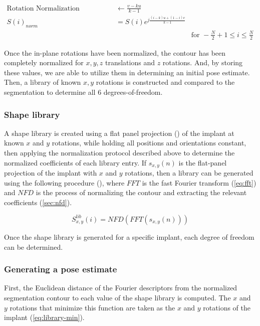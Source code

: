 \begin{equation}
    \begin{aligned}
    \text{Rotation Normalization Coefficient} &\leftarrow \frac{v - ku}{k-1}\\
    S(i)_{norm} &= S(i)e^{j\frac{(i-k)u + (1-i)v}{k-1}} & \\
    & & \text{for } - \frac{N}{2}+1 \le i \le \frac{N}{2}
    \end{aligned}
    \label{eq:fft-rot-norm}
\end{equation}

Once the in-plane rotations have been normalized, the contour has been completely normalized for $x, y,z$ translations and $z$ rotations.
And, by storing these values, we are able to utilize them in determining an initial pose estimate.
Then, a library of known $x,y$ rotations is constructed and compared to the segmentation to determine all 6 degrees-of-freedom.

\subsubsection{Shape library}
A shape library is created using a flat panel projection () of the implant at known $x$ and $y$ rotations, while holding all positions and orientations constant, then applying the normalization protocol described above to determine the normalized coefficients of each library entry.
If $s_{x,y}(n)$ is the flat-panel projection of the implant with $x$ and $y$ rotations, then a library can be generated using the following procedure (), where $FFT$ is the fast Fourier transform (\cref{eq:fft}) and $NFD$ is the process of normalizing the contour and extracting the relevant coefficients (\cref{sec:nfd}).

\begin{equation}
    S^{lib}_{x,y}(i) = NFD(FFT(s_{x,y}(n)))
    \label{eq:lib-generation}
\end{equation}

Once the shape library is generated for a specific implant, each degree of freedom can be determined.

\subsubsection{Generating a pose estimate}
First, the Euclidean distance of the Fourier descriptors from the normalized segmentation contour to each value of the shape library is computed.
The $x$ and $y$ rotations that minimize this function are taken as the $x$ and $y$ rotations of the implant (\cref{eq:library-min}).

